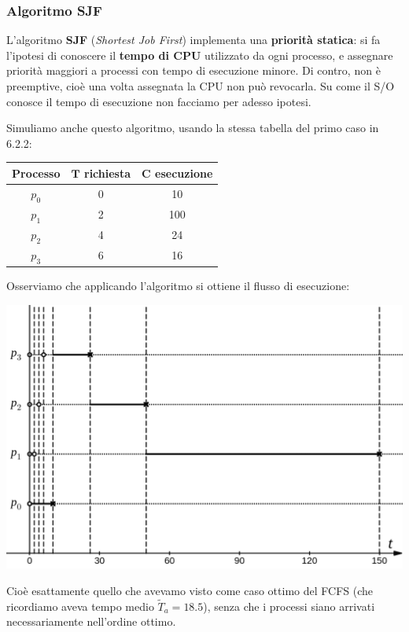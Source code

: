 \documentclass[a4paper,11pt]{article}
\begin{document}
\subsubsection{Algoritmo SJF}
L'algoritmo \textbf{SJF} (\textit{Shortest Job First}) implementa una \textbf{priorità statica}: si fa l'ipotesi di conoscere il \textbf{tempo di CPU} utilizzato da ogni processo, e assegnare priorità maggiori a processi con tempo di esecuzione minore. Di contro, non è preemptive, cioè una volta assegnata la CPU non può revocarla. Su come il S/O conosce il tempo di esecuzione non facciamo per adesso ipotesi. 

\par\smallskip

Simuliamo anche questo algoritmo, usando la stessa tabella del primo caso in 6.2.2:
\begin{table}[H]
	\center {}
	\begin{tabular} { c || c | c }
		\bfseries Processo & \bfseries $\mathbf{T}$ richiesta & \bfseries $\mathbf{C}$ esecuzione \\
		\hline
		$p_0$ & 0 & 10 \\ 
		$p_1$ & 2 & 100 \\ 
		$p_2$ & 4 & 24 \\ 
		$p_3$ & 6 & 16 
	\end{tabular}
\end{table}

\newpage

Osserviamo che applicando l'algoritmo si ottiene il flusso di esecuzione:
\begin{center}
	\includegraphics[scale=0.3]{../figures/sjf.png}
\end{center}
Cioè esattamente quello che avevamo visto come caso ottimo del FCFS (che ricordiamo aveva tempo medio $\tilde{T}_a = 18.5$), senza che i processi siano arrivati necessariamente nell'ordine ottimo.
\end{document}
